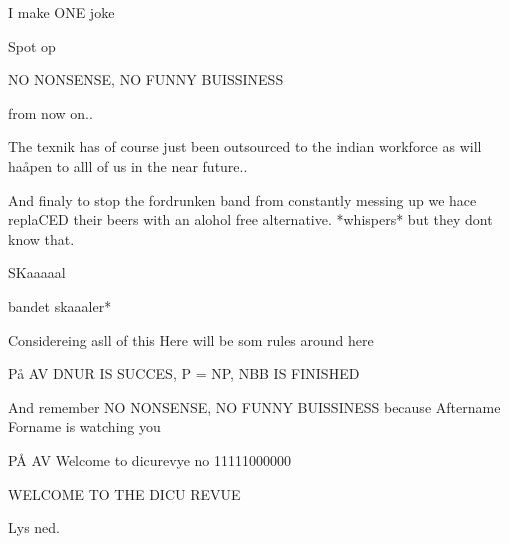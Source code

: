 \documentclass{article}
\begin{document}
\begin{sketch}
 I make ONE joke


\scene Spot op

 NO NONSENSE, NO FUNNY BUISSINESS

 from now on..

 The texnik has of course just been outsourced to the indian workforce as will haåpen to alll of us in the near future..


 And finaly to stop the fordrunken band from constantly messing up we hace replaCED their beers with an alohol free alternative. *whispers* but they dont know that. 


SKaaaaal 

\scene *bandet skaaaler*




Considereing asll of this Here will be som rules around here


\scene På AV {DNUR IS SUCCES, P = NP, NBB IS FINISHED}




And remember NO NONSENSE, NO FUNNY BUISSINESS because Aftername Forname is watching you


\scene PÅ AV  {Welcome to dicurevye no 11111000000}

 WELCOME TO THE DICU REVUE





\scene Lys ned.

\end{sketch}
\end{document}
